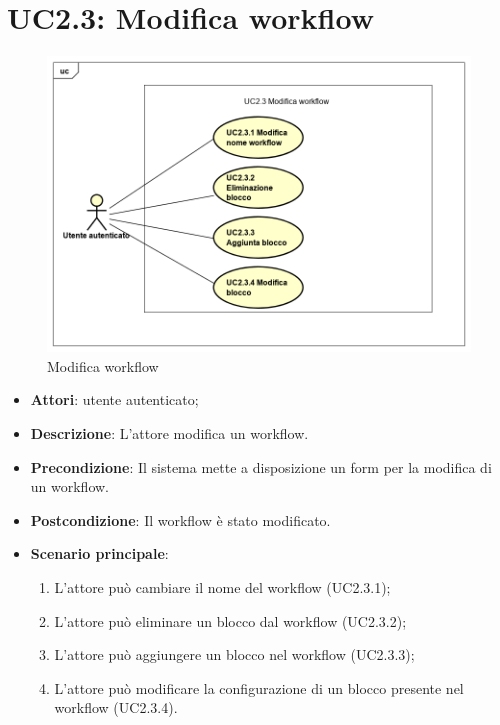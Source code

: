 \section{UC2.3: Modifica workflow}
\label{UC2.3}
\begin{figure} [h]
	\centering
	\includegraphics[scale=0.4]{./Diagram/UC2-3.png}
	\caption{Modifica workflow}\label{}
\end{figure}
\begin{itemize}
	\item \textbf{Attori}: utente autenticato;
	\item \textbf{Descrizione}: L'attore modifica un workflow.
	\item \textbf{Precondizione}: Il sistema mette a disposizione un form per la modifica di un workflow.
	\item \textbf{Postcondizione}: Il workflow è stato modificato.
	\item \textbf{Scenario principale}:
	\begin{enumerate} \item L'attore può cambiare il nome del workflow (UC2.3.1);  \item  L'attore può eliminare un blocco dal workflow (UC2.3.2);  \item 
		L'attore può aggiungere un blocco nel workflow (UC2.3.3);  \item  L'attore può modificare la configurazione di un blocco presente nel workflow (UC2.3.4).\end{enumerate}
\end{itemize}

